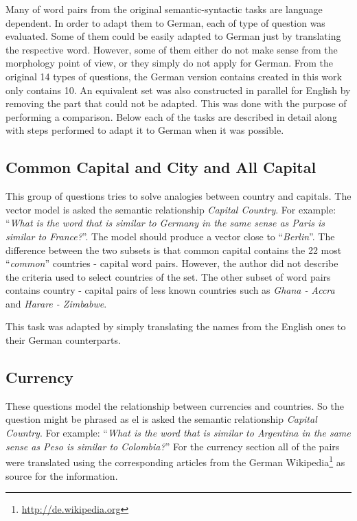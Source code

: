 Many of  word pairs  from the original  semantic-syntactic tasks  are language
dependent. In order to adapt them to German,  each of type of question was
evaluated.  Some of them could  be easily adapted to German
just by translating the respective word. However, some of them either do
not make sense  from the morphology point of view,  or they simply do not
apply for German. From the original 14 types of questions, the German version 
contains created in this work only contains 10. An equivalent set was also
constructed in parallel for  English by removing the part that could not be
adapted. This was done  with the purpose of performing a comparison. Below each of the tasks are described
in detail along with steps performed to adapt it to  German when it was possible.

\subsection{Common Capital and City and All Capital}
\label{sec:sub_sec_common_capital_country}

This group of questions tries  to solve analogies between country and capitals.
The vector model is asked the semantic relationship \emph{Capital Country}.
For example:  ``\emph{What is the word that is similar to
Germany in the same sense as Paris is similar to France?}''. The model should
produce a vector close to ``\emph{Berlin}''. The
difference between the two subsets is that common capital contains
 the 22 most ``\textit{common}'' countries - capital word pairs. However, the
 author did not describe the criteria used to select countries of the set. The
 other subset of word pairs contains country - capital pairs of less known countries such
 as \textit{Ghana  -  Accra} and  \textit{Harare -  Zimbabwe}.

This task was adapted by simply translating the names from
the English ones to their German counterparts. 

\subsection{Currency}
\label{sec:sub_sec_currency}
These questions model the relationship between currencies and countries.  So
the question might be phrased as el is asked the semantic relationship \emph{Capital Country}.
For example:  ``\emph{What is the word that is similar to
Argentina in the same sense as Peso is similar to Colombia?}''
For the currency section all of the pairs were translated using the
corresponding articles from the German 
Wikipedia\footnote{\url{http://de.wikipedia.org}}  as source for the information. 


